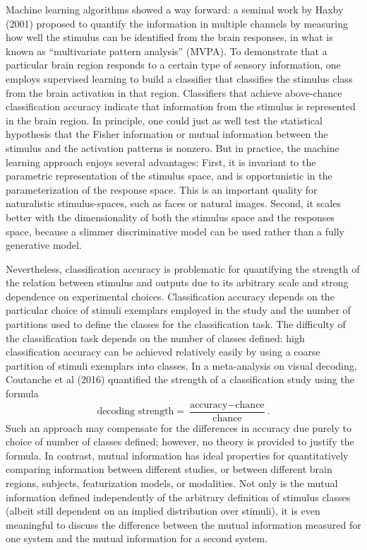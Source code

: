 \documentclass[12pt]{article}
\begin{document}
Machine learning algorithms showed a way forward: a seminal work by
Haxby (2001) proposed to quantify the information in multiple channels
by measuring how well the stimulus can be identified from the brain
responses, in what is known as ``multivariate pattern analysis''
(MVPA). To demonstrate that a particular brain region responds to a
certain type of sensory information, one employs supervised learning
to build a classifier that classifies the stimulus class from the
brain activation in that region. Classifiers that achieve above-chance
classification accuracy indicate that information from the stimulus is
represented in the brain region. In principle, one could just as well
test the statistical hypothesis that the Fisher information or mutual
information between the stimulus and the activation patterns is
nonzero. But in practice, the machine learning approach enjoys several
advantages: First, it is invariant to the parametric representation of
the stimulus space, and is opportunistic in the parameterization of
the response space. This is an important quality for naturalistic
stimulus-spaces, such as faces or natural images. Second, it scales
better with the dimensionality of both the stimulus space and the
responses space, because a slimmer discriminative model can be used
rather than a fully generative model.

Nevertheless, classification accuracy is problematic for quantifying
the strength of the relation between stimulus and outputs due to its
arbitrary scale and strong dependence on experimental
choices. Classification accuracy depends on the particular choice of
stimuli exemplars employed in the study and the number of partitions
used to define the classes for the classification task. The difficulty
of the classification task depends on the number of classes defined:
high classification accuracy can be achieved relatively easily by
using a coarse partition of stimuli exemplars into classes. In a
meta-analysis on visual decoding, Coutanche et al (2016) quantified
the strength of a classification study using the formula
\[
\text{decoding strength} = \frac{\text{accuracy} - \text{chance}}{\text{chance}}.
\]
Such an approach may compensate for the differences in accuracy due
purely to choice of number of classes defined; however, no theory is
provided to justify the formula. In contrast, mutual information has
ideal properties for quantitatively comparing information between
different studies, or between different brain regions, subjects,
featurization models, or modalities. Not only is the mutual
information defined independently of the arbitrary definition of
stimulus classes (albeit still dependent on an implied distribution
over stimuli), it is even meaningful to discuss the difference between
the mutual information measured for one system and the mutual
information for a second system.
\end{document}
